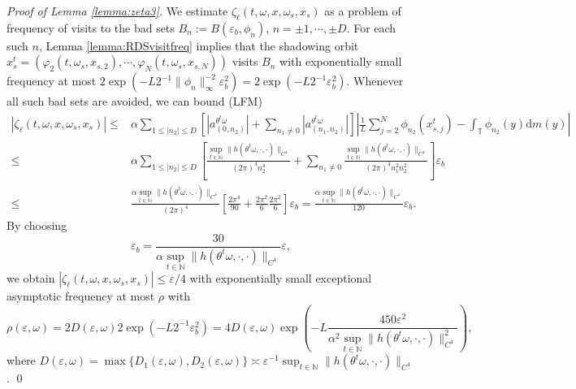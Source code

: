 \documentclass[a4paper]{article}
\theoremstyle{plain}
\theoremstyle{definition}
\newcommand{\T}{\mathbb{T}}
\newcommand{\N}{\mathbb{N}}
\begin{document}
\textit{Proof of Lemma \ref{lemma:zeta3}.}
We estimate $\zeta_{\ell} (t,\omega,x,\omega_{{s}}, x_{{s}})$ as a problem of frequency of visits to the bad sets $B_n:= B(\varepsilon_b, \phi_n)$, $n=\pm1,\cdots,\pm D$. For each such $n$, Lemma \ref{lemma:RDSvisitfreq} implies that the shadowing orbit $x_{{s}}^t = (\varphi_2(t,\omega_{{s}}, x_{{s},2}),\cdots,\varphi_N(t,\omega_{{s}}, x_{{s},N}))$ visits $B_n$ with exponentially small frequency at most
$ 2\exp(-L 2^{-1} \|\phi_n\|_{\infty}^{-2}\varepsilon_b^2)=2\exp(-L 2^{-1} \varepsilon_b^2)$. 
Whenever all such bad sets are avoided, we can bound (LFM)
\begin{align*}
	\left|\zeta_{\ell} (t,\omega,x,\omega_{{s}}, x_{{s}}) \right| \leq& \alpha \sum_{1\leq |n_2|\leq D} \left[|a_{(0,n_2)}^{\theta^t\omega}|   +  \sum_{n_1\neq0} |a_{(n_1,n_2)}^{\theta^t\omega}|  \right]\left|\frac{1}{L} \sum_{j=2}^N\phi_{n_2}(x_{{s},j}^t) - \int_{\T} \phi_{n_2}(y) \mathrm{d}m(y)\right|\\
	\leq& \alpha \sum_{1\leq |n_2|\leq D} \left[ \frac{\sup_{t\in\N }\|h(\theta^t\omega,\cdot,\cdot)\|_{C^4}}{(2\pi)^4 n_2^4} + \sum_{n_1\neq 0} \frac{\sup_{t\in\N }\|h(\theta^t\omega,\cdot,\cdot)\|_{C^4}}{(2\pi)^4 n_1^2n_2^2} \right] \varepsilon_b\\
	\leq& \frac{\alpha\sup_{t\in\N }\|h(\theta^t\omega,\cdot,\cdot)\|_{C^4}}{(2\pi)^4 } \left[\frac{2\pi^4}{90} + \frac{2\pi^2}{6}\frac{2\pi^2}{6} \right]\varepsilon_b = \frac{\alpha\sup_{t\in\N }\|h(\theta^t\omega,\cdot,\cdot)\|_{C^4}}{120 } \varepsilon_b.
\end{align*}
By choosing 
\begin{equation}\label{eq:epsilon_E}
	\varepsilon_b=\frac{30}{\alpha\sup_{t\in\N }\|h(\theta^t\omega,\cdot,\cdot)\|_{C^4}}\varepsilon,
\end{equation}
we obtain $\left|\zeta_{\ell} (t,\omega,x,\omega_{{s}}, x_{{s}}) \right|\leq \varepsilon/4$ with exponentially small exceptional asymptotic frequency at most $\rho$ with 
$$\rho(\varepsilon,\omega)= 2D(\varepsilon,\omega) 2\exp(-L 2^{-1} \varepsilon_b^2) =  4D(\varepsilon,\omega)  \exp\left(-L \frac{450\varepsilon^2}{\alpha^2\sup_{t\in\N }\|h(\theta^t\omega,\cdot,\cdot)\|^2_{C^4}}\right),$$
where $D(\varepsilon,\omega) = \max\{D_1(\varepsilon,\omega),D_2(\varepsilon,\omega)\}\asymp \varepsilon^{-1} \sup_{t\in\N }\|h(\theta^t\omega,\cdot,\cdot)\|_{C^4}$. \qed
\end{document}
